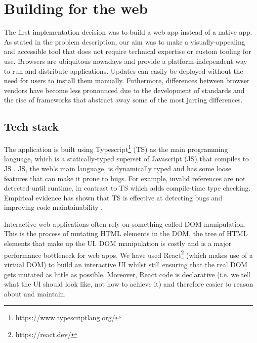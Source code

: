 \documentclass{l4proj}
\begin{document}
\section{Building for the web}
The first implementation decision was to build a web app instead of a native app. As stated in the problem description, our aim was to make a visually-appealing and accessible tool that does not require technical expertise or custom tooling for use. Browsers are ubiquitous nowadays and provide a platform-independent way to run and distribute applications. Updates can easily be deployed without the need for users to install them manually.
Futhermore, differences between browser vendors have become less pronounced due to the development of standards and the rise of frameworks that abstract away some of the most jarring differences.


\subsection{Tech stack}

The application is built using Typescript\footnote{https://www.typescriptlang.org/} (TS) as the main programming language, which is a statically-typed superset of Javascript (JS) that compiles to JS \citep{typescript}.
JS, the web's main language, is dynamically typed and has some loose features that can make it prone to bugs. For example, invalid references are not detected until runtime, in contrast to TS which adds compile-time type checking.
Empirical evidence has shown that TS is effective at detecting bugs and improving code maintainability \citep{typescript_bugs_paper}.

Interactive web applications often rely on something called DOM manipulation. This is the process of mutating HTML elements in the DOM, the tree of HTML elements that make up the UI. DOM manipulation is costly and is a major performance bottleneck for web apps.
We have used React\footnote{https://react.dev/} (which makes use of a virtual DOM) to build an interactive UI whilst still ensuring that the real DOM gets mutated as little as possible.
Moreover, React code is declarative (i.e. we tell what the UI should look like, not how to achieve it) and therefore easier to reason about and maintain.
\end{document}
